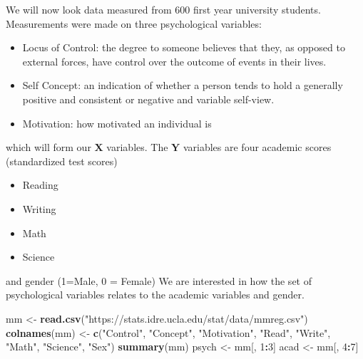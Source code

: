 \documentclass[
]{book}
\newenvironment{Shaded}{\begin{snugshade}}{\end{snugshade}}
\newcommand{\DecValTok}[1]{\textcolor[rgb]{0.00,0.00,0.81}{#1}}
\newcommand{\FunctionTok}[1]{\textcolor[rgb]{0.13,0.29,0.53}{\textbf{#1}}}
\newcommand{\NormalTok}[1]{#1}
\newcommand{\OtherTok}[1]{\textcolor[rgb]{0.56,0.35,0.01}{#1}}
\newcommand{\SpecialCharTok}[1]{\textcolor[rgb]{0.81,0.36,0.00}{\textbf{#1}}}
\newcommand{\StringTok}[1]{\textcolor[rgb]{0.31,0.60,0.02}{#1}}
\providecommand{\tightlist}{%
  \setlength{\itemsep}{0pt}\setlength{\parskip}{0pt}}
\theoremstyle{definition}
\theoremstyle{definition}
\theoremstyle{definition}
\theoremstyle{definition}
\theoremstyle{remark}
\begin{document}
We will now look data measured from 600 first year university students. Measurements were made on three psychological variables:

\begin{itemize}
\tightlist
\item
  Locus of Control: the degree to someone believes that they, as opposed to external forces, have control over the outcome of events in their lives.
\item
  Self Concept: an indication of whether a person tends to hold a generally positive and consistent or negative and variable self-view.
\item
  Motivation: how motivated an individual is
\end{itemize}

which will form our \(\mathbf X\) variables. The \(\mathbf Y\) variables are four academic scores (standardized test scores)

\begin{itemize}
\tightlist
\item
  Reading
\item
  Writing
\item
  Math
\item
  Science
\end{itemize}

and gender (1=Male, 0 = Female) We are interested in how the set of psychological variables relates to the academic variables and gender.

\begin{Shaded}
\begin{Highlighting}[]
\NormalTok{mm }\OtherTok{\textless{}{-}} \FunctionTok{read.csv}\NormalTok{(}\StringTok{"https://stats.idre.ucla.edu/stat/data/mmreg.csv"}\NormalTok{)}
\FunctionTok{colnames}\NormalTok{(mm) }\OtherTok{\textless{}{-}} \FunctionTok{c}\NormalTok{(}\StringTok{"Control"}\NormalTok{, }\StringTok{"Concept"}\NormalTok{, }\StringTok{"Motivation"}\NormalTok{,}
                  \StringTok{"Read"}\NormalTok{, }\StringTok{"Write"}\NormalTok{, }\StringTok{"Math"}\NormalTok{,}
    \StringTok{"Science"}\NormalTok{, }\StringTok{"Sex"}\NormalTok{)}
\FunctionTok{summary}\NormalTok{(mm)}
\NormalTok{psych }\OtherTok{\textless{}{-}}\NormalTok{ mm[, }\DecValTok{1}\SpecialCharTok{:}\DecValTok{3}\NormalTok{]}
\NormalTok{acad }\OtherTok{\textless{}{-}}\NormalTok{ mm[, }\DecValTok{4}\SpecialCharTok{:}\DecValTok{7}\NormalTok{]}
\end{Highlighting}
\end{Shaded}
\end{document}
